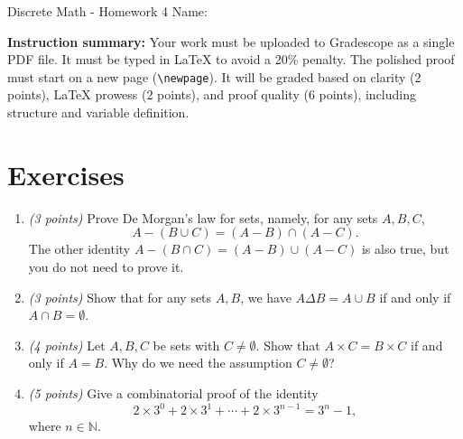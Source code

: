 \documentclass[12pt]{article}
\begin{document}
\begin{center}
    {\LARGE Discrete Math - Homework 4} \Large \newline
    Name:
\end{center}

\vspace{1em}

\noindent \textbf{Instruction summary:} Your work must be uploaded to Gradescope as a single PDF file. It must be typed in LaTeX to avoid a 20\% penalty. The polished proof must start on a new page (\texttt{\textbackslash newpage}). It will be graded based on clarity (2 points), LaTeX prowess (2 points), and proof quality (6 points), including structure and variable definition.

\section*{Exercises}

\begin{enumerate}[itemsep=1.2em]

\item \emph{(3 points)} Prove De Morgan's law for sets, namely, for any sets \( A, B, C \),
\[
A - (B \cup C) = (A - B) \cap (A - C).
\]
The other identity \( A - (B \cap C) = (A - B) \cup (A - C) \) is also true, but you do not need to prove it. \newline

\item \emph{(3 points)} Show that for any sets \( A, B \), we have \( A \Delta B = A \cup B \) if and only if \( A \cap B = \emptyset \). \newline


\item \emph{(4 points)} Let \( A, B, C \) be sets with \( C \neq \emptyset \). Show that \( A \times C = B \times C \) if and only if \( A = B \). Why do we need the assumption \( C \neq \emptyset \)? \newline

\item \emph{(5 points)} Give a combinatorial proof of the identity
\[
2 \times 3^0 + 2 \times 3^1 + \cdots + 2 \times 3^{n-1} = 3^n - 1,
\]
where \( n \in \mathbb{N} \). \newline

\end{enumerate}
\newpage %
\end{document}
